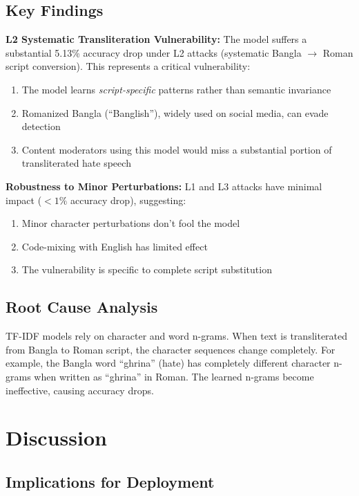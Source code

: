 \documentclass[conference]{IEEEtran}
\begin{document}
\subsection{Key Findings}

\textbf{L2 Systematic Transliteration Vulnerability:} The model suffers a substantial 5.13\% accuracy drop under L2 attacks (systematic Bangla $\to$ Roman script conversion). This represents a critical vulnerability:

\begin{enumerate}
\item The model learns \textit{script-specific} patterns rather than semantic invariance
\item Romanized Bangla (``Banglish''), widely used on social media, can evade detection
\item Content moderators using this model would miss a substantial portion of transliterated hate speech
\end{enumerate}

\textbf{Robustness to Minor Perturbations:} L1 and L3 attacks have minimal impact ($<1\%$ accuracy drop), suggesting:
\begin{enumerate}
\item Minor character perturbations don't fool the model
\item Code-mixing with English has limited effect
\item The vulnerability is specific to complete script substitution
\end{enumerate}

\subsection{Root Cause Analysis}

TF-IDF models rely on character and word n-grams. When text is transliterated from Bangla to Roman script, the character sequences change completely. For example, the Bangla word ``ghrina'' (hate) has completely different character n-grams when written as ``ghrina'' in Roman. The learned n-grams become ineffective, causing accuracy drops.

\section{Discussion}

\subsection{Implications for Deployment}
\end{document}
